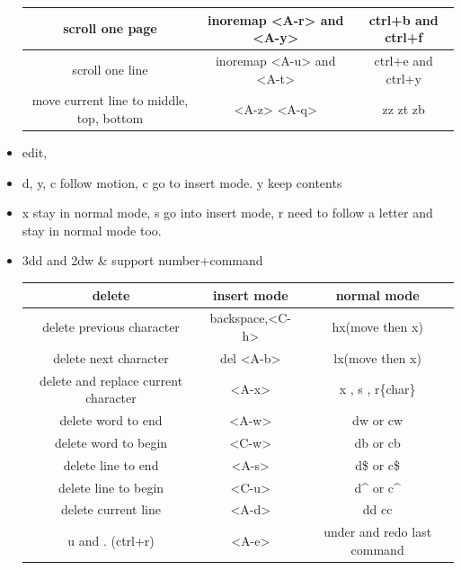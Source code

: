 \documentclass[a4paper,12pt,twoside]{book}
\begin{document}
\begin{itemize}
\begin{center}
\begin{tabular}{c|c|c}
        \hline
        scroll one  page & inoremap <A-r> and <A-y>  & ctrl+b and  ctrl+f    \\
        
        \hline 		  
        scroll one line & inoremap <A-u> and <A-t>  & ctrl+e and ctrl+y \\
        
         \hline 		  
        move current line to middle, top, bottom & <A-z> <A-q>  & zz zt zb \\

    \end{tabular}
\end{center}

\item edit, 
\item d, y, c follow motion, c go to insert mode. y keep contents

\item x stay in normal mode, s go into insert mode, r need to follow a letter and stay in normal mode too.

\item 3dd and 2dw   & support number+command
\begin{center}
		\begin{tabular}{c|c|c}
		\hline
		delete & insert mode & normal mode\\

   	\hline 
		delete previous character & backspace,<C-h> & hx(move then x)  \\
		
		\hline 
		delete next character & del <A-b> & lx(move then x)  \\
		
		\hline 
		delete and replace current character & <A-x> & x , s , r\{char\}  \\
	
		\hline 
		delete word to end & <A-w> &dw or cw  \\
		
		\hline 
		delete word to begin & <C-w> &db or cb  \\
		
		\hline 
		delete line to end & <A-s> &d\$ or c\$  \\
		
		\hline 
		delete line to begin & <C-u> &d^ or c^  \\
		
		\hline 
		delete current line & <A-d> & dd cc \\
		\hline 
		u and . (ctrl+r)  & <A-e> & under and redo last command \\
		

\end{tabular}
\end{center}
\end{itemize}
\end{document}

